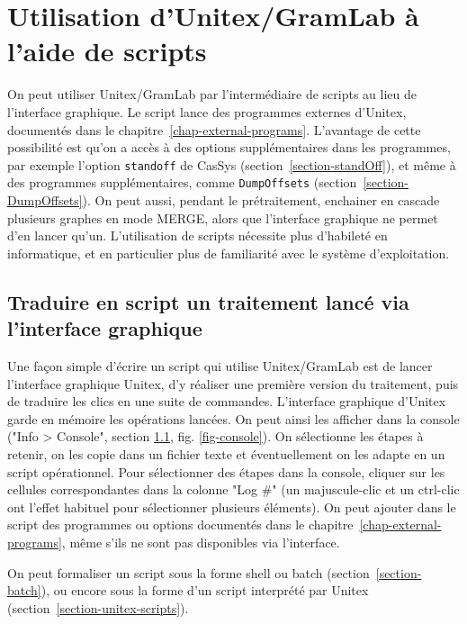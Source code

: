 \chapter{Utilisation d'Unitex/GramLab à l'aide de scripts}
\label{chap-scripts}

On peut utiliser Unitex/GramLab par l'intermédiaire de scripts au lieu de l'interface graphique.
Le script lance des programmes externes d'Unitex, documentés dans le
chapitre~\ref{chap-external-programs}. L'avantage de cette possibilité est qu'on a accès à des options
supplémentaires dans les programmes, par exemple l'option \verb$standoff$ de CasSys
(section~\ref{section-standOff}), et même à des programmes supplémentaires, comme
\verb$DumpOffsets$ (section~\ref{section-DumpOffsets}). On peut aussi, pendant le prétraitement,
enchainer en cascade plusieurs graphes en mode MERGE, alors que l'interface graphique ne permet d'en
lancer qu'un.
L'utilisation de scripts nécessite plus d'habileté en informatique, et en particulier plus de familiarité
avec le système d'exploitation.

\section{Traduire en script un traitement lancé via l'interface graphique}
\label{section-console}

Une façon simple d'écrire un script qui utilise Unitex/GramLab est de lancer l'interface graphique Unitex,
d'y réaliser une première version du traitement, puis de traduire les clics en une suite de commandes.
L'interface graphique d'Unitex garde en mémoire les opérations lancées. On peut ainsi les afficher dans la
console ("Info > Console", section \ref{section-console}, fig. \ref{fig-console}). On sélectionne les étapes
à retenir, on les copie dans un fichier texte et éventuellement on les adapte en un script opérationnel.
Pour sélectionner des étapes dans la console, cliquer sur les cellules correspondantes dans la colonne
"Log \#" (un majuscule-clic et un ctrl-clic ont l'effet habituel pour sélectionner plusieurs éléments).
On peut ajouter dans le script des programmes ou options documentés dans le
chapitre~\ref{chap-external-programs}, même s'ils ne sont pas disponibles via l'interface.

\bigskip
\noindent On peut formaliser un script sous la forme shell ou batch (section~\ref{section-batch}),
ou encore sous la forme d'un script interprété par Unitex (section~\ref{section-unitex-scripts}).

